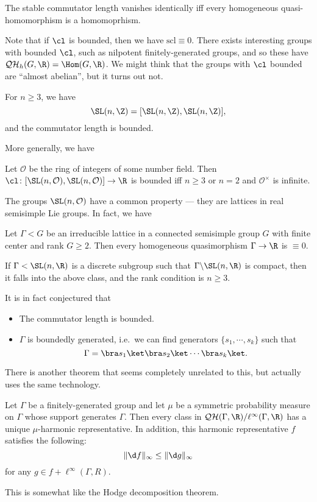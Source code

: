 \documentclass[a4paper]{article}
\newcommand\QH{\mathcal{QH}}
\newcommand\scl{\mathrm{scl}}
\begin{document}
\begin{cor}
  The stable commutator length vanishes identically iff every homogeneous quasi-homomorphism is a homomoprhism.
\end{cor}

Note that if $\cl$ is bounded, then we have $\scl \equiv 0$. There exists interesting groups with bounded $\cl$, such as nilpotent finitely-generated groups, and so these have $\QH_h(G, \R) = \Hom(G, \R)$. We might think that the groups with $\cl$ bounded are ``almost abelian'', but it turns out not.

\begin{thm}
  For $n \geq 3$, we have
  \[
    \SL(n, \Z) = [\SL(n, \Z), \SL(n, \Z)],
  \]
  and the commutator length is bounded.
\end{thm}

More generally, we have
\begin{thm}
  Let $\mathcal{O}$ be the ring of integers of some number field. Then $\cl\colon [\SL(n, \mathcal{O}), \SL(n, \mathcal{O})] \to \R$ is bounded iff $n \geq 3$ or $n = 2$ and $\mathcal{O}^\times$ is infinite.
\end{thm}
The groups $\SL(n, \mathcal{O})$ have a common property --- they are lattices in real semisimple Lie groups. In fact, we have

\begin{thm}
  Let $\Gamma < G$ be an irreducible lattice in a connected semisimple group $G$ with finite center and rank $G \geq 2$. Then every homogeneous quasimorphism $\Gamma \to \R$ is $\equiv 0$.
\end{thm}

\begin{eg}
  If $\Gamma < \SL(n, \R)$ is a discrete subgroup such that $\Gamma \backslash \SL(n, \R)$ is compact, then it falls into the above class, and the rank condition is $n \geq 3$.
\end{eg}
It is in fact conjectured that
\begin{itemize}
  \item The commutator length is bounded.
  \item $\Gamma$ is boundedly generated, i.e.\ we can find generators $\{s_1, \cdots, s_k\}$ such that
    \[
      \Gamma = \bra s_1 \ket \bra s_2\ket \cdots \bra s_k\ket.
    \]
\end{itemize}

There is another theorem that seems completely unrelated to this, but actually uses the same technology.
\begin{thm}
  Let $\Gamma$ be a finitely-generated group and let $\mu$ be a symmetric probability measure on $\Gamma$ whose support generates $\Gamma$. Then every class in $\QH(\Gamma, \R)/\ell^\infty(\Gamma, \R)$ has a unique $\mu$-harmonic representative. In addition, this harmonic representative $f$ satisfies the following:
  \[
    \|\d f\|_\infty \leq \|\d g\|_\infty
  \]
  for any $g \in f+ \ell^\infty(\Gamma, R)$.
\end{thm}
This is somewhat like the Hodge decomposition theorem.
\end{document}
